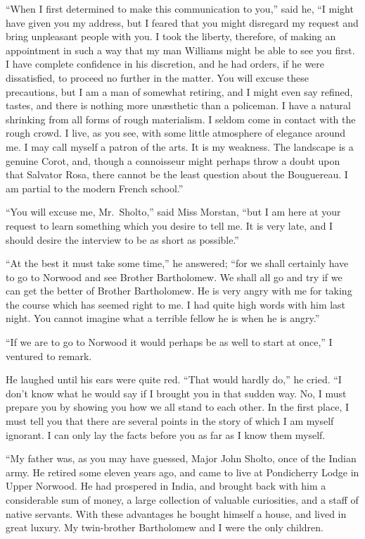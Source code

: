 \documentclass[12pt,english,oneside]{book}
\begin{document}
{}``When I first determined to make this communication to you,''
said he, {}``I might have given you my address, but I feared that
you might disregard my request and bring unpleasant people with you.
I took the liberty, therefore, of making an appointment in such a
way that my man Williams might be able to see you first. I have complete
confidence in his discretion, and he had orders, if he were dissatisfied,
to proceed no further in the matter. You will excuse these precautions,
but I am a man of somewhat retiring, and I might even say refined,
tastes, and there is nothing more un\ae sthetic than a policeman.
I have a natural shrinking from all forms of rough materialism. I
seldom come in contact with the rough crowd. I live, as you see, with
some little atmosphere of elegance around me. I may call myself a
patron of the arts. It is my weakness. The landscape is a genuine
Corot, and, though a connoisseur might perhaps throw a doubt upon
that Salvator Rosa, there cannot be the least question about the Bouguereau.
I am partial to the modern French school.''

{}``You will excuse me, Mr.\ Sholto,'' said Miss Morstan, {}``but
I am here at your request to learn something which you desire to tell
me. It is very late, and I should desire the interview to be as short
as possible.''

{}``At the best it must take some time,'' he answered; {}``for
we shall certainly have to go to Norwood and see Brother Bartholomew.
We shall all go and try if we can get the better of Brother Bartholomew.
He is very angry with me for taking the course which has seemed right
to me. I had quite high words with him last night. You cannot imagine
what a terrible fellow he is when he is angry.''

{}``If we are to go to Norwood it would perhaps be as well to start
at once,'' I ventured to remark.

He laughed until his ears were quite red. {}``That would hardly do,''
he cried. {}``I don't know what he would say if I brought you in
that sudden way. No, I must prepare you by showing you how we all
stand to each other. In the first place, I must tell you that there
are several points in the story of which I am myself ignorant. I can
only lay the facts before you as far as I know them myself.

{}``My father was, as you may have guessed, Major John Sholto, once
of the Indian army. He retired some eleven years ago, and came to
live at Pondicherry Lodge in Upper Norwood. He had prospered in India,
and brought back with him a considerable sum of money, a large collection
of valuable curiosities, and a staff of native servants. With these
advantages he bought himself a house, and lived in great luxury. My
twin-brother Bartholomew and I were the only children.
\end{document}
